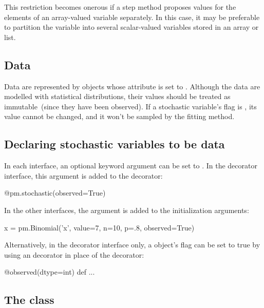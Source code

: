 \documentclass[]{jss}
\begin{document}
This restriction becomes onerous if a step method proposes values for the elements of an array-valued variable separately. In this case, it may be preferable to partition the variable into several scalar-valued variables stored in an array or list.


\subsection{Data} \label{data}


Data are represented by  objects whose  attribute is set to . Although the data are modelled with statistical distributions, their values should be treated as immutable~(since they have been observed). If a stochastic variable's  flag is , its value cannot be changed, and it won't be sampled by the fitting method.

\subsection{Declaring stochastic variables to be data}

In each interface, an optional keyword argument  can be set to . In the decorator interface, this argument is added to the  decorator:

\begin{CodeInput}
@pm.stochastic(observed=True)
\end{CodeInput}

In the other interfaces, the  argument is added to the initialization arguments:

\begin{CodeInput}
x = pm.Binomial('x', value=7, n=10, p=.8, observed=True)
\end{CodeInput}

Alternatively, in the decorator interface only, a  object's  flag can be set to true by using an  decorator in place of the  decorator:
\begin{CodeInput}
@observed(dtype=int)
    def ...
\end{CodeInput}


\subsection[The Deterministic class]{The  class}
\label{deterministic}
\end{document}
